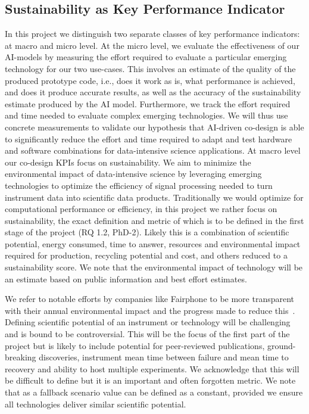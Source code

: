 \documentclass[a4wide,twocolumn]{article}
\begin{document}
\subsection{Sustainability as Key Performance Indicator}

In this project we distinguish two separate classes of key performance indicators: at macro and micro level. 
At the micro level, we evaluate the effectiveness of our AI-models by measuring the effort required to evaluate a particular emerging technology for our two use-cases. 
This involves an estimate of the quality of the produced prototype code, i.e., does it work as is, what performance is achieved, and does it produce accurate results, as well as the accuracy of the sustainability estimate produced by the AI model. 
Furthermore, we track the effort required and time needed to evaluate complex emerging technologies. 
We will thus use concrete measurements to validate our hypothesis that AI-driven co-design is able to significantly reduce the effort and time required to adapt and test hardware and software combinations for data-intensive science applications.
At macro level our co-design KPIs focus on sustainability. We aim to minimize the environmental impact of data-intensive science by leveraging emerging technologies to optimize the efficiency of signal processing needed to turn instrument data into scientific data products. Traditionally we would optimize for computational performance or efficiency, in this project we rather focus on sustainability, the exact definition and metric of which is to be defined in the first stage of the project (RQ 1.2, PhD-2). 
Likely this is a combination of scientific potential, energy consumed, time to answer, resources and environmental impact required for production, recycling potential and cost, and others reduced to a sustainability score. 
We note that the environmental impact of technology will be an estimate based on public information and best effort estimates.

We refer to notable efforts by companies like Fairphone to be more transparent with their annual environmental impact and the progress made to reduce this~\cite{noauthor_impact_nodate}. Defining scientific potential of an instrument or technology will be challenging and is bound to be controversial. This will be the focus of the first part of the project but is likely to include potential for peer-reviewed publications, ground-breaking discoveries, instrument mean time between failure and mean time to recovery and ability to host multiple experiments. We acknowledge that this will be difficult to define but it is an important and often forgotten metric. We note that as a fallback scenario value can be defined as a constant, provided we ensure all technologies deliver similar
scientific potential.
\end{document}

